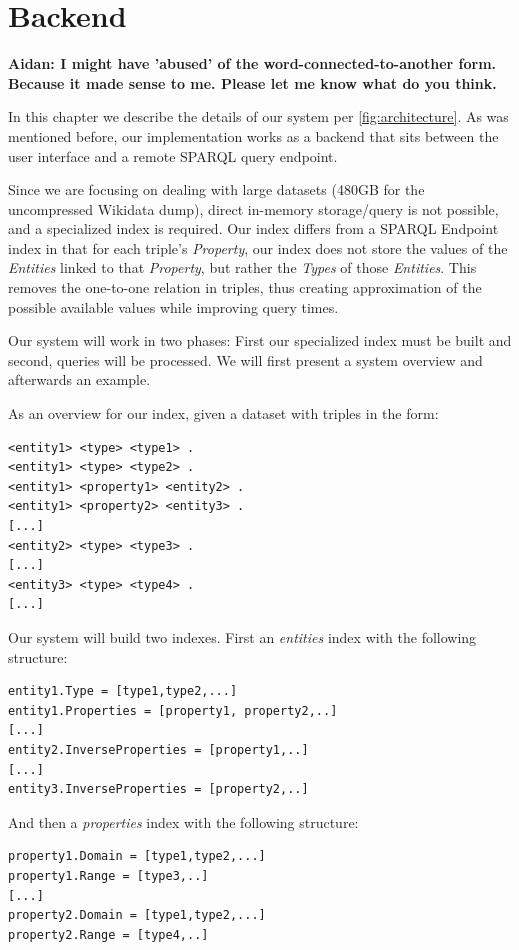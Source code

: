 \chapter{Backend}
\label{chap:Backend}

\textbf{Aidan: I might have 'abused' of the word-connected-to-another form. Because it made sense to me. Please let me know what do you think.}

In this chapter we describe the details of our system per \autoref{fig:architecture}.
As was mentioned before, our implementation works as a backend that sits between the user interface and a remote SPARQL query endpoint.

Since we are focusing on dealing with large datasets (480GB for the uncompressed Wikidata dump), direct in-memory storage/query is not possible, and a specialized index is required. Our index differs from a SPARQL Endpoint index in that for each triple's \textit{Property}, our index does not store the values of the \textit{Entities} linked to that \textit{Property}, but rather the \textit{Types} of those \textit{Entities}. This removes the one-to-one relation in triples, thus creating approximation of the possible available values while improving query times.

Our system will work in two phases: First our specialized index must be built and second, queries will be processed. We will first present a system overview and afterwards an example.

As an overview for our index, given a dataset with triples in the form: 

\begin{verbatim}
<entity1> <type> <type1> . 
<entity1> <type> <type2> .
<entity1> <property1> <entity2> .
<entity1> <property2> <entity3> .
[...]
<entity2> <type> <type3> .
[...]
<entity3> <type> <type4> .
[...]
\end{verbatim}

Our system will build two indexes. First an \textit{entities} index with the following structure:
\begin{verbatim}
entity1.Type = [type1,type2,...]
entity1.Properties = [property1, property2,..]
[...]
entity2.InverseProperties = [property1,..]
[...]
entity3.InverseProperties = [property2,..]
\end{verbatim}

And then a \textit{properties} index with the following structure:
\begin{verbatim}
property1.Domain = [type1,type2,...]
property1.Range = [type3,..]
[...]
property2.Domain = [type1,type2,...]
property2.Range = [type4,..]
\end{verbatim}


